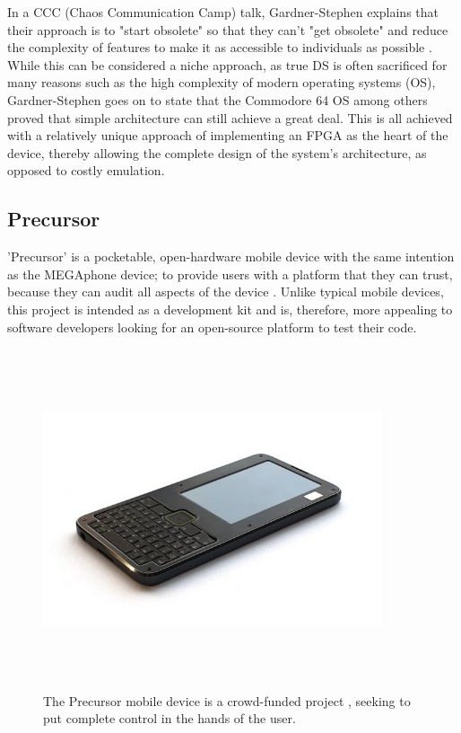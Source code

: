 In a CCC (Chaos Communication Camp) talk, Gardner-Stephen explains that their approach is to "start obsolete" so that they can't "get obsolete" and reduce the complexity of features to make it as accessible to individuals as possible \cite{mobilehistory}.
While this can be considered a niche approach, as true DS is often sacrificed for many reasons such as the high complexity of modern operating systems (OS), Gardner-Stephen goes on to state that the Commodore 64 OS among others proved that simple architecture can still achieve a great deal.
This is all achieved with a relatively unique approach of implementing an FPGA as the heart of the device, thereby allowing the complete design of the system's architecture, as opposed to costly emulation.

\subsection{Precursor}

'Precursor' is a pocketable, open-hardware mobile device with the same intention as the MEGAphone device; to provide users with a platform that they can trust, because they can audit all aspects of the device \cite{precursor}.
Unlike typical mobile devices, this project is intended as a development kit and is, therefore, more appealing to software developers looking for an open-source platform to test their code.

\begin{figure} [h]
    \centering
    \includegraphics[width=10cm,height=10cm,keepaspectratio]{Figures/precursor.png}
    \caption{The Precursor mobile device is a crowd-funded project \cite{precursor}, seeking to put complete control in the hands of the user.}
    \label{fig:Precursor}
\end{figure}

